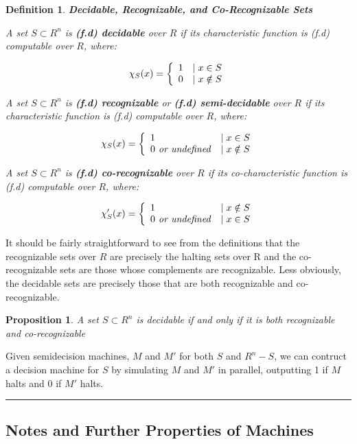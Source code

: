 \documentclass[twoside]{article}
\newtheorem{proposition}{Proposition}[section]
\newtheorem{definition}{Definition}[section]
\newenvironment{proofsketch}{{\bf Proof Sketch:}}{\hfill\rule{2mm}{2mm}}
\begin{document}
\begin{definition}{\textbf{Decidable, Recognizable, and Co-Recognizable Sets}}
  
  A set $S \subset R^n$ is \textbf{(f.d) decidable} over $R$ if its
  characteristic function  is (f.d)
  computable over $R$, where:
  
  $$\chi_S(x) =  \left\{ \begin{array}{ll} 1 & \mid x \in S \\ 0 & \mid x \notin S \end{array} \right.$$
  
  A set $S \subset R^n$ is \textbf{(f.d) recognizable} or
  \textbf{(f.d) semi-decidable} over $R$ if its characteristic
  function  is (f.d) computable over $R$,
  where:
  
  $$\chi_S(x) =  \left\{ \begin{array}{ll} 1 & \mid x \in S \\ 0 \text{\emph{ or undefined}} & \mid x \notin S \end{array} \right.$$
  
  A set $S \subset R^n$ is \textbf{(f.d) co-recognizable} over $R$
  if its co-characteristic function  is (f.d)
  computable over $R$, where:
  
  $$\chi'_S(x) =  \left\{ \begin{array}{ll} 1 & \mid x \notin S \\ 0 \text{\emph{ or undefined}} & \mid x \in S \end{array} \right.$$
  
\end{definition}

  It should be fairly straightforward to see from the
  definitions that the recognizable sets over $R$ are precisely the
  halting sets over R and the co-recognizable sets are those whose
  complements are recognizable. Less obviously, the decidable sets
  are precisely those that are both recognizable and co-recognizable.

\begin{proposition}{A set $S \subset R^n$ is decidable if and only if it is
  both recognizable and co-recognizable}
\end{proposition}
\begin{proofsketch}
  
  Given semidecision machines, $M$ and $M'$ for both $S$ and $R^n -
  S$, we can contruct a decision machine for $S$ by simulating $M$ and
  $M'$ in parallel, outputting 1 if $M$ halts and 0 if $M'$ halts.  


\end{proofsketch}

\subsection{Notes and Further Properties of Machines}
\end{document}
